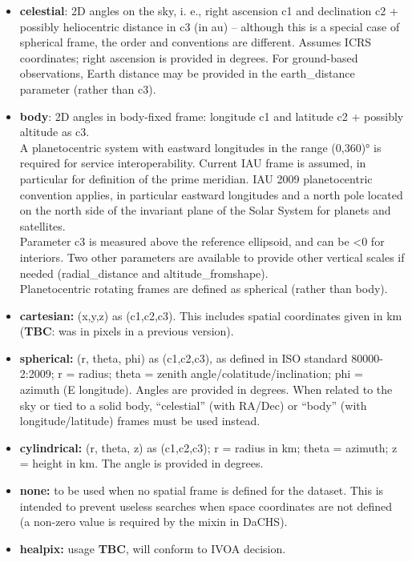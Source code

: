 \documentclass[11pt,a4paper]{ivoa}
\begin{document}
\begin{itemize}

\item \textbf{celestial}: 2D angles on the sky, i. e., right ascension c1 and declination c2 + possibly heliocentric distance in c3 (in au) – although this is a special case of spherical frame, the order and conventions are different. Assumes ICRS coordinates; right ascension is provided in degrees. For ground-based observations, Earth distance may be provided in the earth\_distance parameter (rather than c3). 

\item \textbf{body}: 2D angles in body-fixed frame: longitude c1 and latitude c2 + possibly altitude as c3. \\A planetocentric system with eastward longitudes in the range (0,360)° is required for service interoperability. Current IAU frame is assumed, in particular for definition of the prime meridian. IAU 2009 planetocentric convention applies, in particular eastward longitudes and a north pole located on the north side of the invariant plane of the Solar System for planets and satellites.  \\Parameter c3 is measured above the reference ellipsoid, and can be <0 for interiors. Two other parameters are available to provide other vertical scales if needed (radial\_distance and altitude\_fromshape). \\Planetocentric rotating frames are defined as spherical (rather than body).

\item \textbf{cartesian:} (x,y,z) as (c1,c2,c3). This includes spatial coordinates given in km (\textbf{TBC}: was in pixels in a previous version). 

\item \textbf{spherical:} (r, theta, phi) as (c1,c2,c3), as defined in ISO standard 80000-2:2009; r = radius; theta = zenith angle/colatitude/inclination; phi = azimuth (E longitude). Angles are provided in degrees. When related to the sky or tied to a solid body, ``celestial'' (with RA/Dec) or ``body'' (with longitude/latitude) frames must be used instead.

\item \textbf{cylindrical:} (r, theta, z) as (c1,c2,c3); r = radius in km; theta = azimuth; z = height in km. The angle is provided in degrees.

\item \textbf{none:} to be used when no spatial frame is defined for the dataset. This is intended to prevent useless searches when space coordinates are not defined (a non-zero value is required by the mixin in DaCHS).

\item \textbf{healpix:} usage \textbf{TBC}, will conform to IVOA decision.

\end{itemize}
\end{document}
